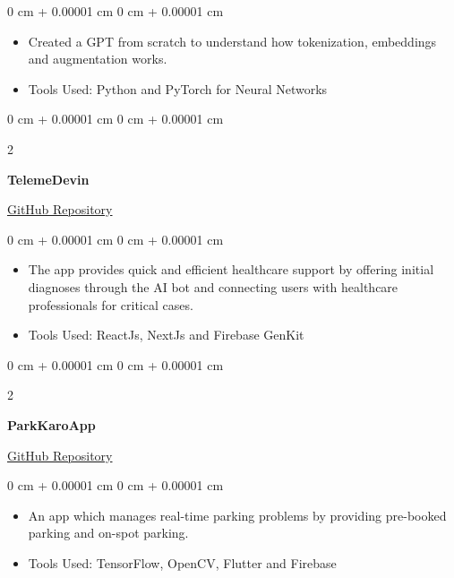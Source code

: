 \documentclass[10pt, letterpaper]{article}
\newenvironment{highlights}{
    \begin{itemize}[
        topsep=0.10 cm,
        parsep=0.10 cm,
        partopsep=0pt,
        itemsep=0pt,
        leftmargin=0 cm + 10pt
    ]
}{
    \end{itemize}
} %
\newenvironment{onecolentry}{
    \begin{adjustwidth}{
        0 cm + 0.00001 cm
    }{
        0 cm + 0.00001 cm
    }
}{
    \end{adjustwidth}
} %
\newenvironment{twocolentry}[2][]{
    \onecolentry
    \def\secondColumn{#2}
    \setcolumnwidth{\fill, 4.5 cm}
    \begin{paracol}{2}
}{
    \switchcolumn \raggedleft \secondColumn
    \end{paracol}
    \endonecolentry
} %
\begin{document}
\begin{onecolentry}
    \begin{highlights}
        \item Created a GPT from scratch to understand how tokenization, embeddings and augmentation works.
        \item Tools Used: Python and PyTorch for Neural Networks
    \end{highlights}
\end{onecolentry}

\vspace{0.2 cm}

\begin{twocolentry}{
    \href{https://github.com/debarshee2004/telemedevin}{GitHub Repository}
}
    \textbf{TelemeDevin}
\end{twocolentry}

\vspace{0.10 cm}

\begin{onecolentry}
    \begin{highlights}
        \item The app provides quick and efficient healthcare support by offering initial diagnoses through the AI bot and connecting users with healthcare professionals for critical cases.
        \item Tools Used: ReactJs, NextJs and Firebase GenKit
    \end{highlights}
\end{onecolentry}
\vspace{0.2 cm}

\begin{twocolentry}{
    \href{https://github.com/debarshee2004/parkkaroapp}{GitHub Repository}
}
    \textbf{ParkKaroApp}
\end{twocolentry}

\vspace{0.10 cm}

\begin{onecolentry}
    \begin{highlights}
        \item An app which manages real-time parking problems by providing pre-booked parking and on-spot parking.
        \item Tools Used: TensorFlow, OpenCV, Flutter and Firebase
    \end{highlights}
\end{onecolentry}
\end{document}
